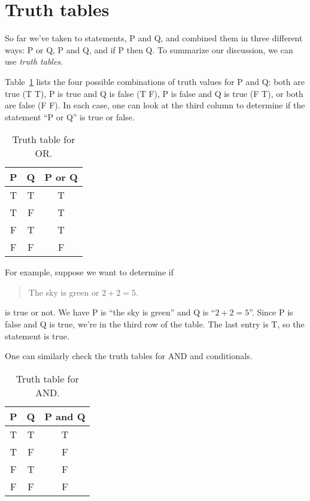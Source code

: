 \documentclass{tufte-book}
\begin{document}


\section{Truth tables}
\label{sec:truth-tables}

So far we've taken to statements, P and Q, and combined them in three different ways: P or Q, P and Q, and if P then Q. To summarize our discussion, we can use \emph{truth tables}. 

Table~\ref{tab:truth-table-or} lists the four possible combinations of truth values for P and Q: both are true (T T), P is true and Q is false (T F), P is false and Q is true (F T), or both are false (F F). In each case, one can look at the third column to determine if the statement ``P or Q'' is true or false.
\begin{table}
  \centering
  \begin{tabular}{ccc}
    \toprule
    P & Q & P or Q \\ \midrule
    T & T & T \\
    T & F & T \\
    F & T & T \\
    F & F & F \\ \bottomrule
  \end{tabular}
  \caption{Truth table for OR.}
  \label{tab:truth-table-or}
\end{table}

For example, suppose we want to determine if 
\begin{quote}
  The sky is green or $2 + 2 = 5$.
\end{quote}
is true or not. We have P is ``the sky is green'' and Q is ``$2 + 2 = 5$''. Since P is false and Q is true, we're in the third row of the table. The last entry is T, so the statement is true.

One can similarly check the truth tables for AND and conditionals.

\begin{table}
  \centering
  \begin{tabular}{ccc}
    \toprule
    P & Q & P and Q \\ \midrule
    T & T & T \\
    T & F & F \\
    F & T & F \\
    F & F & F \\ \bottomrule
  \end{tabular}
  \caption{Truth table for AND.}
  \label{tab:truth-table-and}
\end{table}
\end{document}
